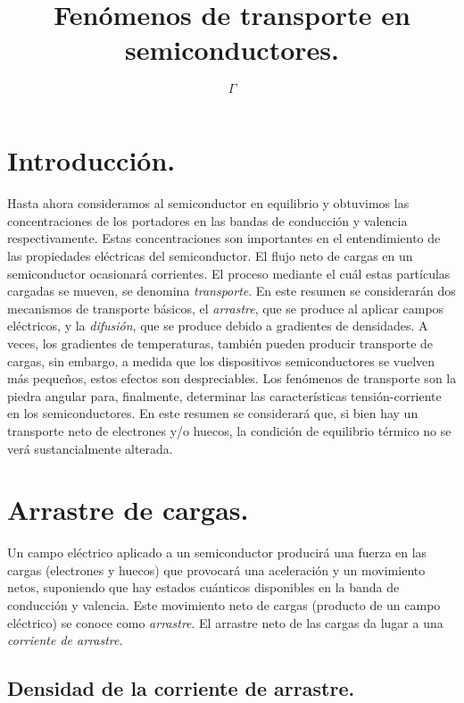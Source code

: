 \documentclass[12pt,a4paper]{article}
\begin{document}
\title{Fenómenos de transporte en semiconductores.}

\author{$\Gamma$}

\maketitle

\section{Introducción.}

Hasta ahora consideramos al semiconductor en equilibrio y obtuvimos las concentraciones de los portadores en las bandas de conducción y valencia respectivamente. Estas concentraciones son importantes en el entendimiento de las propiedades eléctricas del semiconductor. El flujo neto de cargas en un semiconductor ocasionará corrientes. El proceso mediante el cuál estas partículas cargadas se mueven, se denomina \emph{transporte}. En este resumen se considerarán dos mecanismos de transporte básicos, el \emph{arrastre}, que se produce al aplicar campos eléctricos, y la \emph{difusión}, que se produce debido a gradientes de densidades. A veces, los gradientes de temperaturas, también pueden producir transporte de cargas, sin embargo, a medida que los dispositivos semiconductores se vuelven más pequeños, estos efectos son despreciables. Los fenómenos de transporte son la piedra angular para, finalmente, determinar las características tensión-corriente en los semiconductores. En este resumen se considerará que, si bien hay un transporte neto de electrones y/o huecos, la condición de equilibrio térmico no se verá sustancialmente alterada.

\section{Arrastre de cargas.}

Un campo eléctrico aplicado a un semiconductor producirá una fuerza en las cargas (electrones y huecos) que provocará una aceleración y un movimiento netos, suponiendo que hay estados cuánticos disponibles en la banda de conducción y valencia. Este movimiento neto de cargas (producto de un campo eléctrico) se conoce como \emph{arrastre}. El arrastre neto de las cargas da lugar a una \emph{corriente de arrastre}.

\subsection{Densidad de la corriente de arrastre.}
\end{document}
